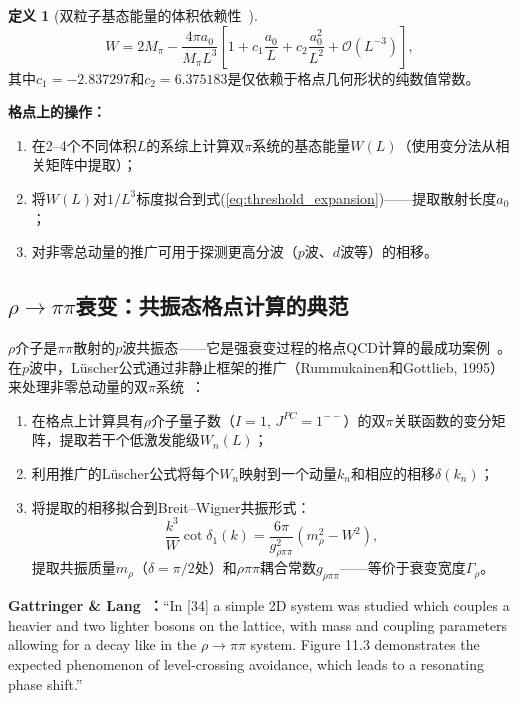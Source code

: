 \documentclass[12pt,a4paper]{ctexart}
\theoremstyle{definition}
\newtheorem{definition}{定义}[section]
\begin{document}
\begin{definition}[双粒子基态能量的体积依赖性~\cite{GattringerLang2010}]
\begin{equation}
\boxed{W = 2M_\pi - \frac{4\pi a_0}{M_\pi L^3} \left[ 1 + c_1\frac{a_0}{L} + c_2\frac{a_0^2}{L^2} + \mathcal{O}(L^{-3}) \right]},
\label{eq:threshold_expansion}
\end{equation}
其中$c_1 = -2.837297$和$c_2 = 6.375183$是仅依赖于格点几何形状的纯数值常数。
\end{definition}

\textbf{格点上的操作：}
\begin{enumerate}[nosep]
    \item 在2--4个不同体积$L$的系综上计算双$\pi$系统的基态能量$W(L)$（使用变分法从相关矩阵中提取）；
    \item 将$W(L)$对$1/L^3$标度拟合到式(\ref{eq:threshold_expansion})——提取散射长度$a_0$；
    \item 对非零总动量的推广可用于探测更高分波（$p$波、$d$波等）的相移。
\end{enumerate}

\subsection{$\rho\to\pi\pi$衰变：共振态格点计算的典范}

$\rho$介子是$\pi\pi$散射的$p$波共振态——它是强衰变过程的格点QCD计算的最成功案例~\cite{GattringerLang2010}。在$p$波中，L\"uscher公式通过非静止框架的推广（Rummukainen和Gottlieb, 1995）来处理非零总动量的双$\pi$系统~\cite{GattringerLang2010}：

\begin{enumerate}[nosep]
    \item 在格点上计算具有$\rho$介子量子数（$I=1$, $J^{PC}=1^{--}$）的双$\pi$关联函数的变分矩阵，提取若干个低激发能级$W_n(L)$；
    \item 利用推广的L\"uscher公式将每个$W_n$映射到一个动量$k_n$和相应的相移$\delta(k_n)$；
    \item 将提取的相移拟合到Breit--Wigner共振形式：
    \begin{equation}
    \frac{k^3}{W} \cot\delta_1(k) = \frac{6\pi}{g_{\rho\pi\pi}^2} (m_\rho^2 - W^2),
    \label{eq:bw_resonance}
    \end{equation}
    提取共振质量$m_\rho$（$\delta = \pi/2$处）和$\rho\pi\pi$耦合常数$g_{\rho\pi\pi}$——等价于衰变宽度$\Gamma_\rho$。
\end{enumerate}

\textbf{Gattringer \& Lang~\cite{GattringerLang2010}：}``In [34] a simple 2D system was studied which couples a heavier and two lighter bosons on the lattice, with mass and coupling parameters allowing for a decay like in the $\rho \to \pi\pi$ system. Figure 11.3 demonstrates the expected phenomenon of level-crossing avoidance, which leads to a resonating phase shift.''
\end{document}
